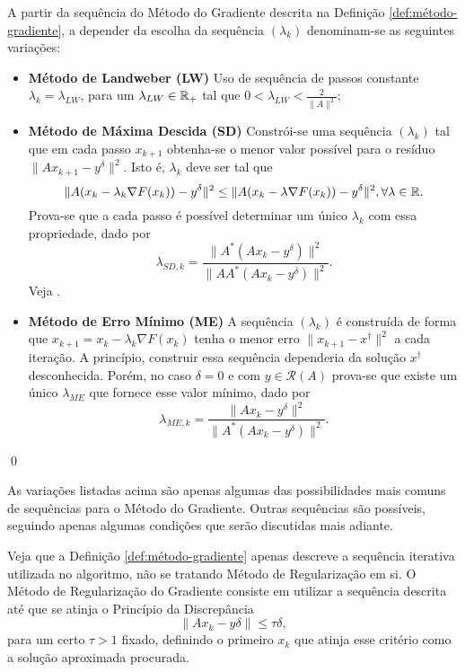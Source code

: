 \begin{defin}\label{def:variacoes-gradiente}
    A partir da sequência do Método do Gradiente descrita na Definição \ref{def:método-gradiente}, a depender da escolha da sequência $(\lambda_k)$ denominam-se as seguintes variações:
    \begin{itemize}
        \item \textbf{Método de Landweber (LW)} Uso de sequência de passos constante $\lambda_k = \lambda_{LW}$, para um $\lambda_{LW}\in \mathbb{R}_+$ tal que $0<\lambda_{LW}<\frac 2 {\| A \|^2}$;
        \item \textbf{Método de Máxima Descida (SD)} Constrói-se uma sequência $(\lambda_k)$ tal que em cada passo $x_{k+1}$ obtenha-se o menor valor possível para o resíduo $\|Ax_{k+1}-y^\delta\|^2$. Isto é, $\lambda_k$ deve ser tal que
        \[
            \|A(x_k-\lambda_k \nabla F(x_k))-y^\delta\|^2 \leq \|A(x_k-\lambda \nabla F(x_k))-y^\delta\|^2, \forall \lambda \in \mathbb{R}.
        \]
        Prova-se que a cada passo é possível determinar um único $\lambda_k$ com essa propriedade, dado por
        \[
        \lambda_{SD,k} = \frac{\|A^*(Ax_k-y^\delta)\|^2}{\|AA^*(Ax_k-y^\delta)\|^2}.
        \]
        Veja \cite{??}.
        \item \textbf{Método de Erro Mínimo (ME)} A sequência $(\lambda_k)$ é construída de forma que $x_{k+1} = x_k-\lambda_k\nabla F(x_k)$ tenha o menor erro $\| x_{k+1}-x^\dag\|^2$ a cada iteração. A princípio, construir essa sequência dependeria da solução $x^\dag$ desconhecida. Porém, no caso $\delta=0$ e com $y \in \mathcal{R}(A)$ prova-se que existe um único $\lambda_{ME}$ que fornece esse valor mínimo, dado por
        \[
            \lambda_{ME,k} = \frac{\|Ax_k-y^\delta\|^2}{\|A^*(Ax_k-y^\delta)\|^2}.
        \]
    \end{itemize}
    \qed
\end{defin}

As variações listadas acima são apenas algumas das possibilidades mais comuns de sequências para o Método do Gradiente. Outras sequências são possíveis, seguindo apenas algumas condições que serão discutidas mais adiante. 

Veja que a Definição \ref{def:método-gradiente} apenas descreve a sequência iterativa utilizada no algoritmo, não se tratando Método de Regularização em si. O Método de Regularização do Gradiente consiste em utilizar a sequência descrita até que se atinja o Princípio da Discrepância
\[
\| Ax_k - y\delta \| \leq \tau \delta,
\]
para um certo $\tau>1$ fixado, definindo o primeiro $x_k$ que atinja esse critério como a solução aproximada procurada.


